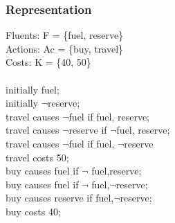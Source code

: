 \documentclass[11pt]{article}
\begin{document}
	\subsubsection{Representation}\label{par:p201}
	Fluents: F = \{fuel, reserve\}\\
	Actions: Ac = \{buy, travel\}\\
	Costs: K = \{40, 50\}\\
	\\
	initially  fuel; \\
	initially $\neg$reserve; \\
	travel causes $\neg$fuel if fuel, reserve; \\
	travel causes $\neg$reserve if $\neg$fuel, reserve;\\
	travel causes $\neg$fuel if fuel, $\neg$reserve\\
	travel costs 50; \\
	buy causes fuel if $\neg$ fuel,reserve;\\
	buy causes fuel if $\neg$ fuel,$\neg$reserve;\\
	buy causes reserve if  fuel,$\neg$reserve;\\
	buy costs 40; \\
\end{document}
